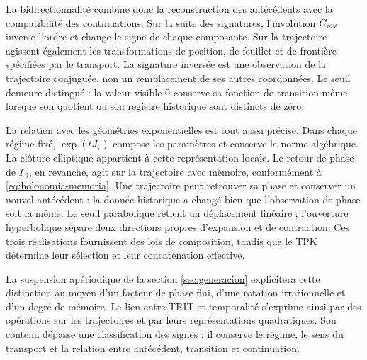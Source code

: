 La bidirectionnalité combine donc la reconstruction des antécédents
avec la compatibilité des continuations. Sur la suite des signatures,
l’involution \(C_{\rm rev}\) inverse l’ordre et change le signe de chaque
composante. Sur la trajectoire agissent également les transformations de
position, de feuillet et de frontière spécifiées par le transport. La signature
inversée est une observation de la trajectoire conjuguée, non un remplacement
de ses autres coordonnées. Le seuil demeure distingué : la valeur
visible \(0\) conserve sa fonction de transition même lorsque son quotient
ou son registre historique sont distincts de zéro.

La relation avec les géométries exponentielles est tout aussi précise. Dans
chaque régime fixé, \(\exp(tJ_\tau)\) compose les paramètres et conserve la
norme algébrique. La clôture elliptique appartient à cette représentation locale.
Le retour de phase de \(\Gamma_9\), en revanche, agit sur la trajectoire
avec mémoire, conformément à \eqref{eq:holonomia-memoria}. Une trajectoire peut
retrouver sa phase et conserver un nouvel antécédent : la donnée historique a
changé bien que l’observation de phase soit la même. Le seuil parabolique
retient un déplacement linéaire ; l’ouverture hyperbolique sépare deux
directions propres d’expansion et de contraction. Ces trois réalisations
fournissent des lois de composition, tandis que le TPK détermine leur
sélection et leur concaténation effective.

La suspension apériodique de la section \ref{sec:generacion} explicitera
cette distinction au moyen d’un facteur de phase fini, d’une rotation irrationnelle
et d’un degré de mémoire. Le lien entre TRIT et temporalité s’exprime ainsi
par des opérations sur les trajectoires et par leurs représentations
quadratiques. Son contenu dépasse une classification des signes : il conserve le
régime, le sens du transport et la relation entre antécédent,
transition et continuation.
